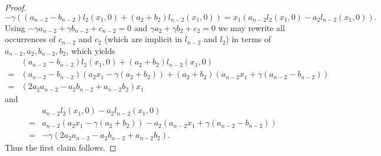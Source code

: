 \documentclass[10pt,a4paper]{amsart}
\begin{document}
\begin{proof}
 \begin{equation*}
     -\gamma((a_{n-2}-b_{n-2})l_2(x_1,0) + (a_2+b_2)l_{n-2}(x_1,0)) = x_1(a_{n-2}l_2(x_1,0) - a_2l_{n-2}(x_1,0)).
 \end{equation*}
 Using $-\gamma a_{n-2} + \gamma b_{n-2} + c_{n-2} = 0$ and $\gamma a_2 + \gamma b_2 + c_2 = 0$ we may rewrite all occurrences of $c_{n-2}$ and $c_2$ (which are implicit in $l_{n-2}$ and $l_2$) in terms of $a_{n-2},a_2,b_{n-2},b_2$, which yields
 \begin{equation*}
 \begin{split}
     &(a_{n-2} - b_{n-2})l_2(x_1,0) + (a_2 + b_2)l_{n-2}(x_1,0)  \\ =&
     (a_{n-2} - b_{n-2})(a_2x_1-\gamma(a_2+b_2)) + (a_2 + b_2)(a_{n-2}x_1 + \gamma(a_{n-2}-b_{n-2}))  \\ =&
     (2a_2a_{n-2} - a_2b_{n-2} + a_{n-2}b_2)x_1
 \end{split}
 \end{equation*}
 and
 \begin{equation*}
 \begin{split}
     &a_{n-2}l_2(x_1,0) - a_2l_{n-2}(x_1,0)  \\ =
     &a_{n-2}(a_2x_1 - \gamma(a_2+b_2)) - a_2(a_{n-2}x_1 + \gamma(a_{n-2} - b_{n-2}))  \\ =&
     - \gamma(2a_2a_{n-2} - a_2b_{n-2} + a_{n-2}b_2).
 \end{split}
 \end{equation*}
 Thus the first claim follows.


\end{proof}
\end{document}
